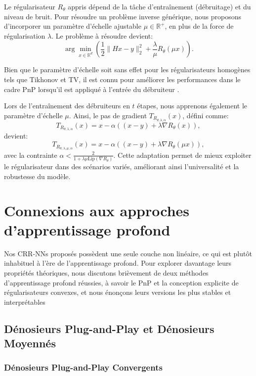 \documentclass[a4paper, 12pt]{report} %
\begin{document}
Le régularisateur \( R_\theta \) appris dépend de la tâche d'entraînement (débruitage) et du niveau de bruit. Pour résoudre un problème inverse générique, nous proposons d'incorporer un paramètre d'échelle ajustable \( \mu \in \mathbb{R}^+ \), en plus de la force de régularisation \( \lambda \). Le problème à résoudre devient:
\[
\arg \min_{x \in \mathbb{R}^d} \left( \frac{1}{2} \|Hx - y\|_2^2 + \frac{\lambda}{\mu} R_\theta(\mu x) \right).
\]

Bien que le paramètre d'échelle soit sans effet pour les régularisateurs homogènes tels que Tikhonov et TV, il est connu pour améliorer les performances dans le cadre PnP lorsqu'il est appliqué à l'entrée du débruiteur \cite{xu2020boosting}. 

Lors de l'entraînement des débruiteurs en \( t \) étapes, nous apprenons également le paramètre d'échelle \( \mu \). Ainsi, le pas de gradient \( T_{R_{\theta, \lambda, \alpha}}(x) \), défini comme:
\[
T_{R_{\theta, \lambda, \alpha}}(x) = x - \alpha \left( (x - y) + \lambda \nabla R_\theta(x) \right),
\]
devient:
\[
T_{R_{\theta, \lambda, \mu, \alpha}}(x) = x - \alpha \left( (x - y) + \lambda \nabla R_\theta(\mu x) \right),
\]
avec la contrainte \( \alpha < \frac{2}{1 + \lambda \mu \text{Lip}(\nabla R_\theta)} \). Cette adaptation permet de mieux exploiter le régularisateur dans des scénarios variés, améliorant ainsi l'universalité et la robustesse du modèle.


\section{Connexions aux approches d'apprentissage profond}
Nos CRR-NNs proposés possèdent une seule couche non linéaire, ce qui est plutôt inhabituel à l'ère de l'apprentissage profond. Pour explorer davantage leurs propriétés théoriques, nous discutons brièvement de deux méthodes d'apprentissage profond réussies, à savoir le PnP et la conception explicite de régularisateurs convexes, et nous énonçons leurs versions les plus stables et interprétables

\subsection{Dénosieurs Plug-and-Play et Dénosieurs Moyennés}
\subsubsection{Dénosieurs Plug-and-Play Convergents}
\end{document}
